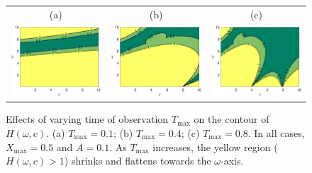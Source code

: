 \documentclass[a4paper,11pt]{article}
\begin{document}
\begin{figure}
\centering
\begin{tabular}{ccc}
(a)&(b)&(c)\\
\includegraphics[width=2in]{Figures/MIPcontour4.eps}&
\includegraphics[width=2in]{Figures/MIPcontour5.eps}&
\includegraphics[width=2in]{Figures/MIPcontour6.eps}
\end{tabular}
\caption{Effects of varying time of observation $T_{\max}$ on the contour of $H(\omega,c)$. (a) $T_{\max}=0.1$; (b) $T_{\max}=0.4$; (c) $T_{\max}=0.8$.  In all cases, $X_{\max}=0.5$ and $A=0.1$. As $T_{\max}$ increases, the yellow region ($H(\omega,c)>1$) shrinks and flattens towards the $\omega$-axis.}\label{fig.MIPtest2}
\end{figure}
\end{document}
